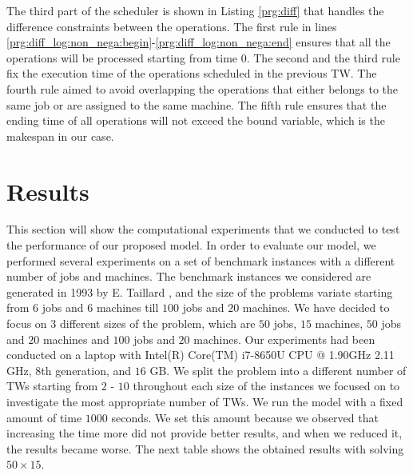 \documentclass[runningheads]{llncs}
\begin{document}
% 

The third part of the scheduler is shown in Listing \ref{prg:diff} that handles the difference constraints between the operations. The first rule in lines \ref{prg:diff_log:non_nega:begin}-\ref{prg:diff_log:non_nega:end} ensures that all the operations will be processed starting from time $0$. The second and the third rule fix the execution time of the operations scheduled in the previous TW. The fourth rule aimed to avoid overlapping the operations that either belongs to the same job or are assigned to the same machine. The fifth rule ensures that the ending time of all operations will not exceed the bound variable, which is the makespan in our case. 


\section{Results}
This section will show the computational experiments that we conducted to test the performance of our proposed model. In order to evaluate our model, we performed several experiments on a set of benchmark instances with a different number of jobs and machines. The benchmark instances we considered are generated in 1993 by E. Taillard \cite{taillard1993benchmarks}, and the size of the problems variate starting from $6$ jobs and $6$ machines till $100$ jobs and $20$ machines. We have decided to focus on $3$ different sizes of the problem, which are $50$ jobs, $15$ machines, $50$ jobs and $20$ machines and $100$ jobs and $20$ machines. Our experiments had been conducted on a laptop with Intel(R) Core(TM) i7-8650U CPU @ 1.90GHz 2.11 GHz, 8th generation, and $16$ GB. We split the problem into a different number of TWs starting from $2$ - $10$ throughout each size of the instances we focused on to investigate the most appropriate number of TWs. We run the model with a fixed amount of time $1000$ seconds. We set this amount because we observed that increasing the time more did not provide better results, and when we reduced it, the results became worse. The next table shows the obtained results with solving $50 \times 15$.
\end{document}
